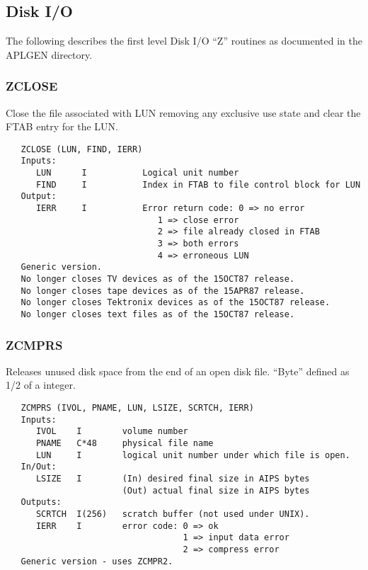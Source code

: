 \subsection{Disk I/O}

   The following describes the first level Disk I/O ``Z'' routines as
documented in the APLGEN directory.

\subsubsection{ZCLOSE}
Close the file associated with LUN removing any exclusive use state
and clear the FTAB entry for the LUN.
\begin{verbatim}
   ZCLOSE (LUN, FIND, IERR)
   Inputs:
      LUN      I           Logical unit number
      FIND     I           Index in FTAB to file control block for LUN
   Output:
      IERR     I           Error return code: 0 => no error
                              1 => close error
                              2 => file already closed in FTAB
                              3 => both errors
                              4 => erroneous LUN
   Generic version.
   No longer closes TV devices as of the 15OCT87 release.
   No longer closes tape devices as of the 15APR87 release.
   No longer closes Tektronix devices as of the 15OCT87 release.
   No longer closes text files as of the 15OCT87 release.
\end{verbatim}

\subsubsection{ZCMPRS}
Releases unused disk space from the end of an open disk file.
``Byte'' defined as 1/2 of a integer.
\begin{verbatim}
   ZCMPRS (IVOL, PNAME, LUN, LSIZE, SCRTCH, IERR)
   Inputs:
      IVOL    I        volume number
      PNAME   C*48     physical file name
      LUN     I        logical unit number under which file is open.
   In/Out:
      LSIZE   I        (In) desired final size in AIPS bytes
                       (Out) actual final size in AIPS bytes
   Outputs:
      SCRTCH  I(256)   scratch buffer (not used under UNIX).
      IERR    I        error code: 0 => ok
                                   1 => input data error
                                   2 => compress error
   Generic version - uses ZCMPR2.
\end{verbatim}

